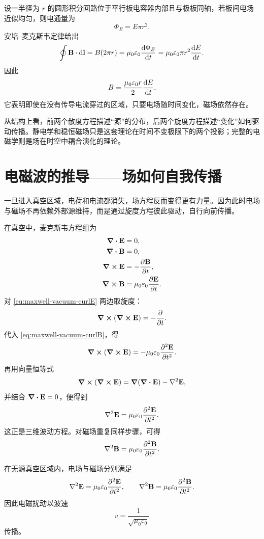 \begin{example}[平行板电容器边缘处的磁场]
设一半径为 $r$ 的圆形积分回路位于平行板电容器内部且与极板同轴，若板间电场近似均匀，则电通量为
\[
\Phi_E=E\pi r^2.
\]
安培--麦克斯韦定律给出
\[
\oint \vb{B}\cdot \dd\vb{l}=B(2\pi r)=\mu_0\varepsilon_0 \dv{\Phi_E}{t}
=\mu_0\varepsilon_0 \pi r^2 \dv{E}{t}.
\]
因此
\[
B=\frac{\mu_0\varepsilon_0 r}{2}\dv{E}{t}.
\]
它表明即使在没有传导电流穿过的区域，只要电场随时间变化，磁场依然存在。
\end{example}

\begin{remark}
从结构上看，前两个散度方程描述“源”的分布，后两个旋度方程描述“变化”如何驱动传播。静电学和稳恒磁场只是这套理论在时间不变极限下的两个投影；完整的电磁学则是场在时空中耦合演化的理论。
\end{remark}

\section{电磁波的推导——场如何自我传播}

一旦进入真空区域，电荷和电流都消失，场方程反而变得更有力量。因为此时电场与磁场不再依赖外部源维持，而是通过旋度方程彼此驱动，自行向前传播。

在真空中，麦克斯韦方程组为
\begin{align}
\div \vb{E} &= 0, \label{eq:maxwell-vacuum-divE}\\
\div \vb{B} &= 0, \label{eq:maxwell-vacuum-divB}\\
\curl \vb{E} &= -\pdv{\vb{B}}{t}, \label{eq:maxwell-vacuum-curlE}\\
\curl \vb{B} &= \mu_0\varepsilon_0\pdv{\vb{E}}{t}. \label{eq:maxwell-vacuum-curlB}
\end{align}
对 \cref{eq:maxwell-vacuum-curlE} 两边取旋度：
\[
\curl(\curl \vb{E})=-\pdv{}{t}(\curl \vb{B}).
\]
代入 \cref{eq:maxwell-vacuum-curlB}，得
\[
\curl(\curl \vb{E})=-\mu_0\varepsilon_0\pdv[2]{\vb{E}}{t}.
\]
再用向量恒等式
\[
\curl(\curl \vb{E})=\grad(\div\vb{E})-\nabla^2 \vb{E},
\]
并结合 $\div\vb{E}=0$，便得到
\[
\nabla^2 \vb{E}=\mu_0\varepsilon_0\pdv[2]{\vb{E}}{t}.
\]
这正是三维波动方程。对磁场重复同样步骤，可得
\[
\nabla^2 \vb{B}=\mu_0\varepsilon_0\pdv[2]{\vb{B}}{t}.
\]

\begin{theorem}[真空中的电磁波动方程]
在无源真空区域内，电场与磁场分别满足
\[
\nabla^2 \vb{E}=\mu_0\varepsilon_0\pdv[2]{\vb{E}}{t},
\qquad
\nabla^2 \vb{B}=\mu_0\varepsilon_0\pdv[2]{\vb{B}}{t}.
\]
因此电磁扰动以波速
\[
 v=\frac{1}{\sqrt{\mu_0\varepsilon_0}}
\]
传播。
\end{theorem}

